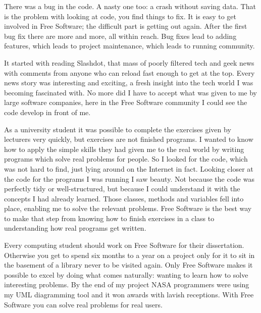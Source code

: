 

\noindent{}There was a bug in the code. A nasty one too: a crash without saving data.
That is the problem with looking at code, you find things to fix. It is easy to get
involved in Free Software; the difficult part is getting out again. After the
first bug fix there are more and more, all within reach. Bug fixes lead to
adding features, which leads to project maintenance, which leads to running
community. 

It started with reading Slashdot, that mass of poorly filtered tech and geek
news with comments from anyone who can reload fast enough to get at the top.
Every news story was interesting and exciting, a fresh insight into the tech
world I was becoming fascinated with. No more did I have to accept what was
given to me by large software companies, here in the Free Software community I
could see the code develop in front of me.

As a university student it was possible to complete the exercises given by
lecturers very quickly, but exercises are not finished programs. I wanted to
know how to apply the simple skills they had given me to the real world by
writing programs which solve real problems for people. So I looked for the code,
which was not hard to find, just lying around on the Internet in fact. 
Looking closer at the code for the programs I was running I saw beauty. Not
because the code was perfectly tidy or well-structured, but because I could
understand it with the concepts I had already learned. Those classes, methods
and variables fell into place, enabling me to solve the relevant problems. Free
Software is the best way to make that step from knowing how to finish exercises
in a class to understanding how real programs get written.

Every computing student should work on Free Software for their dissertation.
Otherwise you get to spend six months to a year on a project only for it to sit
in the basement of a library never to be visited again. Only Free Software makes
it possible to excel by doing what comes naturally: wanting to learn how to
solve interesting problems. By the end of my project NASA programmers were using
my UML diagramming tool and it won awards with lavish receptions. With Free
Software you can solve real problems for real users.

